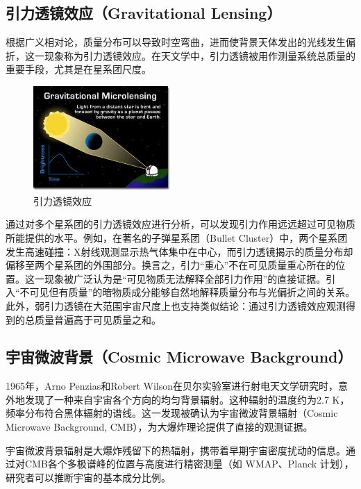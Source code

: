 \documentclass{beamer} %
\begin{document}
\subsection{引力透镜效应（Gravitational Lensing）}

\begin{frame}
根据广义相对论，质量分布可以导致时空弯曲，进而使背景天体发出的光线发生偏折，这一现象称为引力透镜效应。在天文学中，引力透镜被用作测量系统总质量的重要手段，尤其是在星系团尺度。

\begin{figure}[!htbp]
    \centering    
    \includegraphics[height=4cm]{Img/2-2.jpg}
    \caption{引力透镜效应 }
    \label{2-2}
\end{figure}
\end{frame}

\begin{frame}
通过对多个星系团的引力透镜效应进行分析，可以发现引力作用远远超过可见物质所能提供的水平。例如，在著名的子弹星系团（Bullet Cluster）中，两个星系团发生高速碰撞：X射线观测显示热气体集中在中心，而引力透镜揭示的质量分布却偏移至两个星系团的外围部分。换言之，引力“重心”不在可见质量重心所在的位置。这一现象被广泛认为是“可见物质无法解释全部引力作用”的直接证据。引入“不可见但有质量”的暗物质成分能够自然地解释质量分布与光偏折之间的关系。此外，弱引力透镜在大范围宇宙尺度上也支持类似结论：通过引力透镜效应观测得到的总质量普遍高于可见质量之和。
\end{frame}

\subsection{宇宙微波背景（Cosmic Microwave Background）}

\begin{frame}
1965年，Arno Penzias和Robert Wilson在贝尔实验室进行射电天文学研究时，意外地发现了一种来自宇宙各个方向的均匀背景辐射。这种辐射的温度约为2.7 K，频率分布符合黑体辐射的谱线。这一发现被确认为宇宙微波背景辐射（Cosmic Microwave Background, CMB），为大爆炸理论提供了直接的观测证据。

宇宙微波背景辐射是大爆炸残留下的热辐射，携带着早期宇宙密度扰动的信息。通过对CMB各个多极谱峰的位置与高度进行精密测量（如 WMAP、Planck 计划），研究者可以推断宇宙的基本成分比例。
\end{frame}
\end{document}
